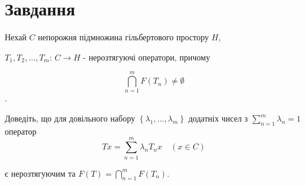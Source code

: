 
\chapter{Завдання \theHchapter}

\begin{tcolorbox}[title=Завдання]
    Нехай $C$ непорожня підмножина гільбертового простору $H$, 


    $T_{1}, T_{2}, \ldots, T_{m}$: $C \rightarrow H$ - 
    нерозтягуючі оператори, причому 


    $$\bigcap\limits_{n=1}^{m} F\left(T_{n}\right) \neq \emptyset$$. 
    
    
    Доведіть, що для довільного набору 
    $\left\{\lambda_{1}, \ldots, \lambda_{m}\right\}$ 
    додатніх чисел з $ \sum\limits_{n=1}^{m} \lambda_{n}=1$ оператор
    $$T x=\sum_{n=1}^{m} \lambda_{n} T_{n} x \quad(x \in C)$$

    є нерозтягуючим та $F(T)=\bigcap\limits_{n=1}^{m} F\left(T_{n}\right)$.

\end{tcolorbox}

